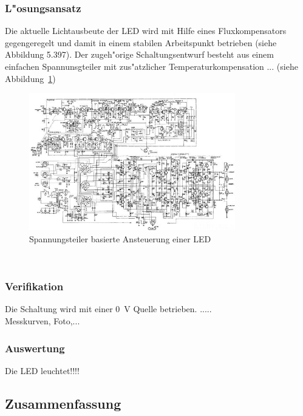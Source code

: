 \subsubsection{L"osungsansatz}
Die aktuelle Lichtausbeute der LED wird mit Hilfe eines Fluxkompensators gegengeregelt und damit in einem stabilen Arbeitspunkt betrieben (siehe Abbildung 5.397). Der zugeh"orige Schaltungsentwurf besteht aus einem einfachen Spannunsgteiler mit zus"atzlicher Temperaturkompensation ... (siehe Abbildung~\ref{fig:schaltplan})
\begin{figure}[tb]
\centering
		\includegraphics[width=0.80\textwidth]{pics/schaltplan_.jpg}
	\caption{Spannungsteiler basierte Ansteuerung einer LED}
	\label{fig:schaltplan}
\end{figure}
\\
\subsubsection{Verifikation}
Die Schaltung wird mit einer 0~V Quelle betrieben. .....\\
Messkurven, Foto,...
\\
\subsubsection{Auswertung}
Die LED leuchtet!!!!
\subsection{Zusammenfassung}

